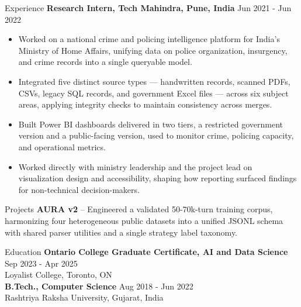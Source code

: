 \documentclass{resume}
\begin{document}
\begin{rSection}{Experience}
\textbf{Research Intern, Tech Mahindra, Pune, India} \hfill Jun 2021 - Jun 2022
\begin{itemize}
    \item Worked on a national crime and policing intelligence platform for India's Ministry of Home Affairs, unifying data on police organization, insurgency, and crime records into a single queryable model.
    \item Integrated five distinct source types --- handwritten records, scanned PDFs, CSVs, legacy SQL records, and government Excel files --- across six subject areas, applying integrity checks to maintain consistency across merges.
    \item Built Power BI dashboards delivered in two tiers, a restricted government version and a public-facing version, used to monitor crime, policing capacity, and operational metrics.
    \item Worked directly with ministry leadership and the project lead on visualization design and accessibility, shaping how reporting surfaced findings for non-technical decision-makers.
\end{itemize}

\end{rSection}

\begin{rSection}{Projects}
\vspace{0.4em}
\textbf{AURA v2} -- Engineered a validated 50-70k-turn training corpus, harmonizing four heterogeneous public datasets into a unified JSONL schema with shared parser utilities and a single strategy label taxonomy.

\end{rSection}

\begin{rSection}{Education}
\vspace{0.4em}
\textbf{Ontario College Graduate Certificate, AI and Data Science} \hfill Sep 2023 - Apr 2025 \\
Loyalist College, Toronto, ON \\
\textbf{B.Tech., Computer Science} \hfill Aug 2018 - Jun 2022 \\
Rashtriya Raksha University, Gujarat, India
\end{rSection}
\end{document}
